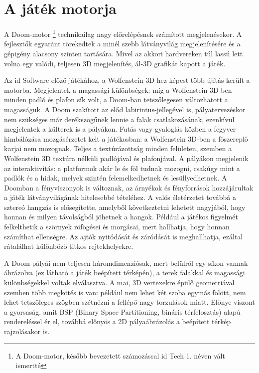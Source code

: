 \documentclass{thesis-ekf}
\theoremstyle{definition}
\theoremstyle{remark}
\begin{document}
\section{A játék motorja}

A Doom-motor \footnote{A Doom-motor, később bevezetett számozással id Tech 1.
néven vált ismertté} technikailag nagy előrelépésnek számított megjelenésekor. A
fejlesztők egyaránt törekedtek a minél szebb látványvilág megjelenítésére és a
gépigény alacsony szinten tartására. Mivel az akkori hardvereken túl lassú lett
volna egy valódi, teljesen 3D megjelenítés, ál-3D grafikát kapott a játék.

Az id Software előző játékához, a Wolfenstein 3D-hez képest több újítás került a
motorba. Megjelentek a magassági különbségek: míg a Wolfenstein 3D-ben minden
padló és plafon sík volt, a Doom-ban tetszőlegesen változhatott a magasságuk. A
Doom szakított az előd labirintus-jellegével is, pályatervezéskor nem szükséges
már derékszögűnek lennie a falak csatlakozásának, ezenkívül megjelentek a
külterek is a pályákon. Futás vagy gyaloglás közben a fegyver himbálózása
mozgásérzetet kelt a játékosban: a Wolfenstein 3D-ben a főszereplő karjai nem
mozognak. Teljes a textúrázottság minden felületen, szemben a Wolfenstein 3D
textúra nélküli padlójával és plafonjával. A pályákon megjelenik az
interaktivitás: a platformok akár le és föl tudnak mozogni, csakúgy mint a
padlók és a hidak, melyek szintén felemelkedhetnek és lesüllyedhetnek. A Doomban
a fényviszonyok is változnak, az árnyékok és fényforrások hozzájárultak a játék
látványvilágának hitelesebbé tételéhez. A valós életérzetet továbbá a sztereó
hangzás is elősegítette, amelyből következtetni lehetett nagyjából, hogy honnan
és milyen távolságból jöhetnek a hangok. Például a játékos figyelmét
felkelthetik a szörnyek röfögései és morgásai, mert hallhatja, hogy honnan
számíthat ellenségre. Az ajtók nyitódását és záródását is meghallhatja, ezáltal
rátalálhat különböző titkos rejtekhelyekre.

A Doom pályái nem teljesen háromdimenziósak, mert belülről egy síkon vannak
ábrázolva (ez látható a játék beépített térképén), a terek falakkal és
magassági különbségekkel voltak elválasztva. A mai, 3D vertexekre épülő
geometriával szemben több megkötés is van: például nem lehet két szoba egymás
fölött, nem lehet tetszőleges szögben szétnézni a fellépő nagy torzulások miatt.
Előnye viszont a gyorsaság, amit BSP (Binary Space Partitioning, bináris
térfelosztás) alapú rendereléssel ér el, továbbá előnyös a 2D pályaábrázolás a
beépített térkép rajzolásakor is.
\end{document}
